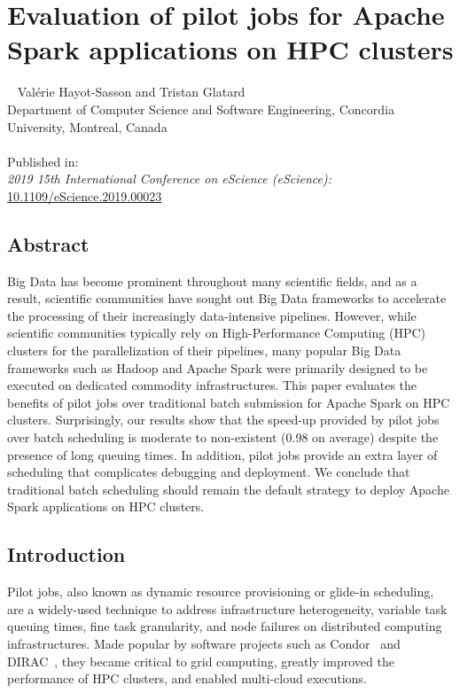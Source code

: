 \chapter{Evaluation of pilot jobs for Apache Spark applications on HPC
clusters}~\label{chp:spa} Val\'erie Hayot-Sasson and Tristan Glatard \\
\begingroup \footnotesize Department of Computer Science and Software
Engineering, Concordia University, Montreal, Canada \\
\endgroup 
\vspace{5pt} \\
Published in: \\
\hspace*{10pt} \textit{2019 15th International Conference on eScience
(eScience):} \url{10.1109/eScience.2019.00023}


\section{Abstract}
	Big Data has become prominent throughout many scientific fields, and as
	a result, scientific communities have sought out Big Data frameworks to
	accelerate the processing of their increasingly data-intensive
	pipelines. However, while scientific communities typically rely on
	High-Performance Computing (HPC) clusters for the parallelization of
	their pipelines, many popular Big Data frameworks such as Hadoop and
	Apache Spark were primarily designed to be executed on dedicated
	commodity infrastructures. This paper evaluates the benefits of pilot
	jobs over traditional batch submission for Apache Spark on HPC clusters.
	Surprisingly, our results show that the speed-up provided by pilot jobs
	over batch scheduling is moderate to non-existent (0.98 on average)
	despite the presence of long queuing times. In addition, pilot jobs
	provide an extra layer of scheduling that complicates debugging and
	deployment. We conclude that traditional batch scheduling should remain
	the default strategy to deploy Apache Spark applications on HPC
	clusters.
    
    
    \section{Introduction}
    
    Pilot jobs, also known as dynamic resource provisioning or glide-in
    scheduling, are a widely-used technique to address infrastructure
    heterogeneity, variable task queuing times, fine task granularity, and node
    failures on distributed computing infrastructures. Made popular by software
    projects such as Condor~\cite{thain2005distributed} and
    DIRAC~\cite{casajus2010dirac}, they became critical to grid computing,
    greatly improved the performance of HPC clusters, and enabled multi-cloud
    executions. 
    
